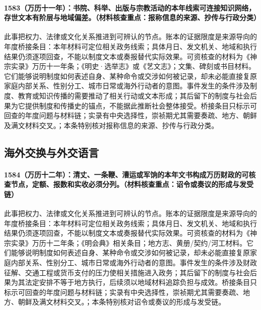 \paragraph{1583（万历十一年）：书院、科举、出版与宗教活动的本年线索可连接知识网络，存世文本有阶层与地域偏差。（材料核查重点：报称信息的来源、抄传与行政分类）} 此事把权力、法律或文化关系推进到可辨认的节点。账本的证据限度是来源导向的年度桥接条目：本年材料可定位相关政务线索；具体月日、发文机关、地域和执行结果仍须逐项回查，不能以制度文本或奏报替代实际效果。可资核查的材料为《神宗实录》万历十一年条；《明史·选举志》或《艺文志》；文集、碑刻或书目材料。它们能够说明制度如何表述自身、某种命令或交涉如何被记录，却未必能直接复原家庭内部关系、性别分工、城市日常或海外行动者的意图。事件发生的条件涉及制度、教育或知识传播的需要推动了相关行动或文本形成；其后留下的制度与社会后果为它提供制度和传播史的锚点，不能据此推断社会整体接受。桥接条目只标示可回查的年度问题与材料链；实录有中央选择性，崇祯期尤其需要奏疏、地方、朝鲜及满文材料交叉。；本条特别核对报称信息的来源、抄传与行政分类。

\subsection{海外交换与外交语言}

\paragraph{1584（万历十二年）：清丈、一条鞭、漕运或军饷的本年文书构成万历财政的可核查节点，定额、报数和实收必须分列。（材料核查重点：诏令或奏议的形成与发受链）} 此事把权力、法律或文化关系推进到可辨认的节点。账本的证据限度是来源导向的年度桥接条目：本年材料可定位相关政务线索；具体月日、发文机关、地域和执行结果仍须逐项回查，不能以制度文本或奏报替代实际效果。可资核查的材料为《神宗实录》万历十二年条；《明会典》相关条目；地方志、黄册/契约/河工材料。它们能够说明制度如何表述自身、某种命令或交涉如何被记录，却未必能直接复原家庭内部关系、性别分工、城市日常或海外行动者的意图。事件发生的条件涉及财政征解、交通工程或货币支付的压力使相关措施进入政务；其后留下的制度与社会后果为其法定安排不等于地方执行，后续须以地域材料追踪负担与成效。桥接条目只标示可回查的年度问题与材料链；实录有中央选择性，崇祯期尤其需要奏疏、地方、朝鲜及满文材料交叉。；本条特别核对诏令或奏议的形成与发受链。

